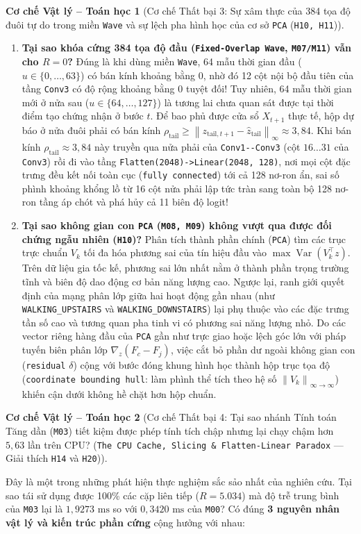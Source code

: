 \documentclass[11pt,a4paper]{article}
\newcommand{\norm}[1]{\left\lVert #1\right\rVert}
\newcommand{\code}[1]{{\small\ttfamily\nolinkurl{#1}}}
\newtheorem{mechanism}{Cơ chế Vật lý -- Toán học}[section]
\begin{document}
\begin{mechanism}[Cơ chế Thất bại 3: Sự xâm thực của 384 tọa độ đuôi tự do trong miền \code{Wave} và sự lệch pha hình học của cơ sở \code{PCA} (\code{H10, H11})]
\end{mechanism}
\begin{enumerate}
  \item \textbf{Tại sao khóa cứng 384 tọa độ đầu (\code{Fixed-Overlap Wave}, \code{M07/M11}) vẫn cho $R=0$?}
  Đúng là khi dùng miền \code{Wave}, 64 mẫu thời gian đầu ($u \in \{0,\dots,63\}$) có bán kính khoảng bằng $0$, nhờ đó 12 cột nội bộ đầu tiên của tầng \code{Conv3} có độ rộng khoảng bằng $0$ tuyệt đối! Tuy nhiên, 64 mẫu thời gian mới ở nửa sau ($u \in \{64,\dots,127\}$) là tương lai chưa quan sát được tại thời điểm tạo chứng nhận ở bước $t$. Để bao phủ được cửa sổ $X_{t+1}$ thực tế, hộp dự báo ở nửa đuôi phải có bán kính $\rho_{\text{tail}} \ge \norm{z_{\text{tail}, t+1} - \hat{z}_{\text{tail}}}_\infty \approx 3,84$. Khi bán kính $\rho_{\text{tail}} \approx 3,84$ này truyền qua nửa phải của \code{Conv1--Conv3} (cột $16\dots31$ của \code{Conv3}) rồi đi vào tầng \code{Flatten(2048)->Linear(2048, 128)}, nơi mọi cột đặc trưng đều kết nối toàn cục (\code{fully connected}) tới cả 128 nơ-ron ẩn, sai số phình khoảng khổng lồ từ 16 cột nửa phải lập tức tràn sang toàn bộ 128 nơ-ron tầng áp chót và phá hủy cả 11 biên độ logit!
  \item \textbf{Tại sao không gian con \code{PCA} (\code{M08, M09}) không vượt qua được đối chứng ngẫu nhiên (\code{H10})?}
  Phân tích thành phần chính (\code{PCA}) tìm các trục trực chuẩn $V_k$ tối đa hóa phương sai của tín hiệu đầu vào $\max \operatorname{Var}(V_k^\top z)$. Trên dữ liệu gia tốc kế, phương sai lớn nhất nằm ở thành phần trọng trường tĩnh và biên độ dao động cơ bản năng lượng cao. Ngược lại, ranh giới quyết định của mạng phân lớp giữa hai hoạt động gần nhau (như \code{WALKING\_UPSTAIRS} và \code{WALKING\_DOWNSTAIRS}) lại phụ thuộc vào các đặc trưng tần số cao và tương quan pha tinh vi có phương sai năng lượng nhỏ. Do các vector riêng hàng đầu của \code{PCA} gần như trực giao hoặc lệch góc lớn với pháp tuyến biên phân lớp $\nabla_z (F_c - F_j)$, việc cắt bỏ phần dư ngoài không gian con (\code{residual} $\delta$) cộng với bước đóng khung hình học thành hộp trục tọa độ (\code{coordinate bounding hull}: làm phình thể tích theo hệ số $\norm{V_k}_{\infty \to \infty}$) khiến cận dưới không hề chặt hơn hộp chuẩn.
\end{enumerate}

\begin{mechanism}[Cơ chế Thất bại 4: Tại sao nhánh Tính toán Tăng dần (\code{M03}) tiết kiệm được phép tính tích chập nhưng lại chạy chậm hơn $5,63$ lần trên CPU? (\code{The CPU Cache, Slicing \& Flatten-Linear Paradox} --- Giải thích \code{H14} và \code{H20})]
\end{mechanism}
Đây là một trong những phát hiện thực nghiệm sắc sảo nhất của nghiên cứu. Tại sao tái sử dụng được 100\% các cặp liên tiếp ($R=5.034$) mà độ trễ trung bình của \code{M03} lại là $1,9273\text{ ms}$ so với $0,3420\text{ ms}$ của \code{M00}? Có đúng \textbf{3 nguyên nhân vật lý và kiến trúc phần cứng} cộng hưởng với nhau:
\end{document}
